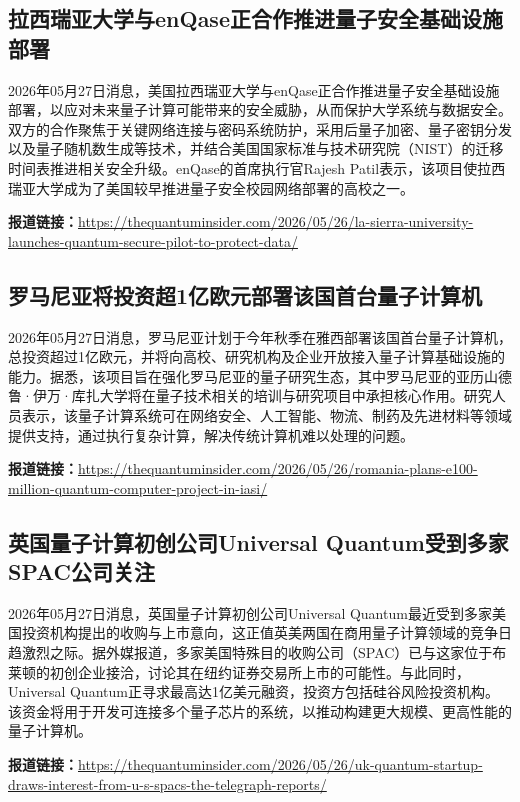 \documentclass[12pt,a4paper]{ctexart}
\begin{document}
\subsection{ 拉西瑞亚大学与enQase正合作推进量子安全基础设施部署 }

2026年05月27日消息，美国拉西瑞亚大学与enQase正合作推进量子安全基础设施部署，以应对未来量子计算可能带来的安全威胁，从而保护大学系统与数据安全。双方的合作聚焦于关键网络连接与密码系统防护，采用后量子加密、量子密钥分发以及量子随机数生成等技术，并结合美国国家标准与技术研究院（NIST）的迁移时间表推进相关安全升级。enQase的首席执行官Rajesh Patil表示，该项目使拉西瑞亚大学成为了美国较早推进量子安全校园网络部署的高校之一。

\noindent\textbf{报道链接：}\url{https://thequantuminsider.com/2026/05/26/la-sierra-university-launches-quantum-secure-pilot-to-protect-data/}

\subsection{ 罗马尼亚将投资超1亿欧元部署该国首台量子计算机 }

2026年05月27日消息，罗马尼亚计划于今年秋季在雅西部署该国首台量子计算机，总投资超过1亿欧元，并将向高校、研究机构及企业开放接入量子计算基础设施的能力。据悉，该项目旨在强化罗马尼亚的量子研究生态，其中罗马尼亚的亚历山德鲁·伊万·库扎大学将在量子技术相关的培训与研究项目中承担核心作用。研究人员表示，该量子计算系统可在网络安全、人工智能、物流、制药及先进材料等领域提供支持，通过执行复杂计算，解决传统计算机难以处理的问题。

\noindent\textbf{报道链接：}\url{https://thequantuminsider.com/2026/05/26/romania-plans-e100-million-quantum-computer-project-in-iasi/}

\subsection{ 英国量子计算初创公司Universal Quantum受到多家SPAC公司关注 }

2026年05月27日消息，英国量子计算初创公司Universal Quantum最近受到多家美国投资机构提出的收购与上市意向，这正值英美两国在商用量子计算领域的竞争日趋激烈之际。据外媒报道，多家美国特殊目的收购公司（SPAC）已与这家位于布莱顿的初创企业接洽，讨论其在纽约证券交易所上市的可能性。与此同时，Universal Quantum正寻求最高达1亿美元融资，投资方包括硅谷风险投资机构。该资金将用于开发可连接多个量子芯片的系统，以推动构建更大规模、更高性能的量子计算机。

\noindent\textbf{报道链接：}\url{https://thequantuminsider.com/2026/05/26/uk-quantum-startup-draws-interest-from-u-s-spacs-the-telegraph-reports/}
\end{document}
